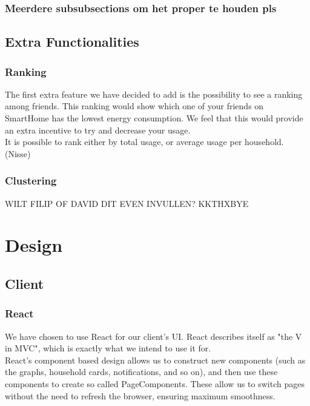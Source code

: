 \documentclass[11pt]{article}
\begin{document}
	\subsubsection{Meerdere subsubsections om het proper te houden pls}

  \subsection{Extra Functionalities}
	\subsubsection{Ranking}
		The first extra feature we have decided to add is the possibility to see a ranking among friends.
		This ranking would show which one of your friends on SmartHome has the lowest energy consumption.
		We feel that this would provide an extra incentive to try and decrease your usage.\\

		It is possible to rank either by total usage, or average usage per household.\\

		(Nisse)

	\subsubsection{Clustering}
		WILT FILIP OF DAVID DIT EVEN INVULLEN? KKTHXBYE

\section{Design}
  \subsection{Client}
	\subsubsection{React}
		We have chosen to use React for our client's UI. React describes itself as "the V in MVC",
		which is exactly what we intend to use it for.\\
		
		React's component based design allows us to construct new components (such as the graphs, household cards, notifications, and so on),
		and then use these components to create so called PageComponents. These allow us to switch pages without the need to refresh the browser,
		ensuring maximum smoothness.
\end{document}
